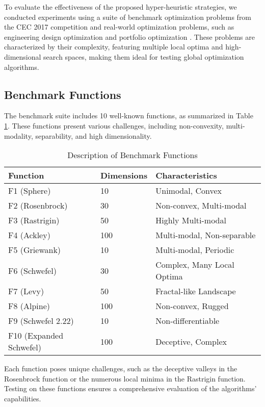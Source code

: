 \documentclass[conference]
{IEEEtran}
\begin{document}
To evaluate the effectiveness of the proposed hyper-heuristic strategies, we conducted experiments using a suite of benchmark optimization problems from the CEC 2017 competition and real-world optimization problems, such as engineering design optimization \cite{yang2010engineering} and portfolio optimization \cite{chang2000heuristics}. These problems are characterized by their complexity, featuring multiple local optima and high-dimensional search spaces, making them ideal for testing global optimization algorithms.

\subsection{Benchmark Functions}

The benchmark suite includes 10 well-known functions, as summarized in Table \ref{tab:benchmark_functions}. These functions present various challenges, including non-convexity, multi-modality, separability, and high dimensionality.

\begin{table}[H]
\caption{Description of Benchmark Functions}
\label{tab:benchmark_functions}
\centering
\begin{tabular}{@{}lll@{}}
\toprule
\textbf{Function} & \textbf{Dimensions} & \textbf{Characteristics} \\
\midrule
F1 (Sphere) & 10 & Unimodal, Convex \\
F2 (Rosenbrock) & 30 & Non-convex, Multi-modal \\
F3 (Rastrigin) & 50 & Highly Multi-modal \\
F4 (Ackley) & 100 & Multi-modal, Non-separable \\
F5 (Griewank) & 10 & Multi-modal, Periodic \\
F6 (Schwefel) & 30 & Complex, Many Local Optima \\
F7 (Levy) & 50 & Fractal-like Landscape \\
F8 (Alpine) & 100 & Non-convex, Rugged \\
F9 (Schwefel 2.22) & 10 & Non-differentiable \\
F10 (Expanded Schwefel) & 100 & Deceptive, Complex \\
\bottomrule
\end{tabular}
\end{table}

Each function poses unique challenges, such as the deceptive valleys in the Rosenbrock function or the numerous local minima in the Rastrigin function. Testing on these functions ensures a comprehensive evaluation of the algorithms' capabilities.
\end{document}
